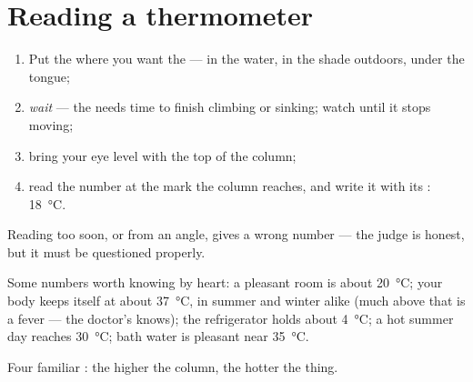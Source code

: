 \section{Reading a thermometer}

\begin{method}\label{met:g3:temperature-thermometers:read}
\begin{enumerate}
  \item Put the  where you want the  --- in
        the water, in the shade outdoors, under the tongue;
  \item \emph{wait} --- the  needs time to finish climbing or
        sinking; watch until it stops moving;
  \item bring your eye level with the top of the column;
  \item read the number at the mark the column reaches, and write it
        with its : \qty{18}{\celsius}.
\end{enumerate}
Reading too soon, or from an angle, gives a wrong number --- the
judge is honest, but it must be questioned properly.
\end{method}

\begin{example}\label{ex:g3:temperature-thermometers:livedby}
Some numbers worth knowing by heart: a pleasant room is about
\qty{20}{\celsius}; your body keeps itself at about
\qty{37}{\celsius}, in summer and winter alike (much above that is a
fever --- the doctor's  knows); the refrigerator holds
about \qty{4}{\celsius}; a hot summer day reaches \qty{30}{\celsius};
bath water is pleasant near \qty{35}{\celsius}.
\end{example}

\begin{omfigure}

{\small Four familiar : the higher the column, the
hotter the thing.}
\end{omfigure}

